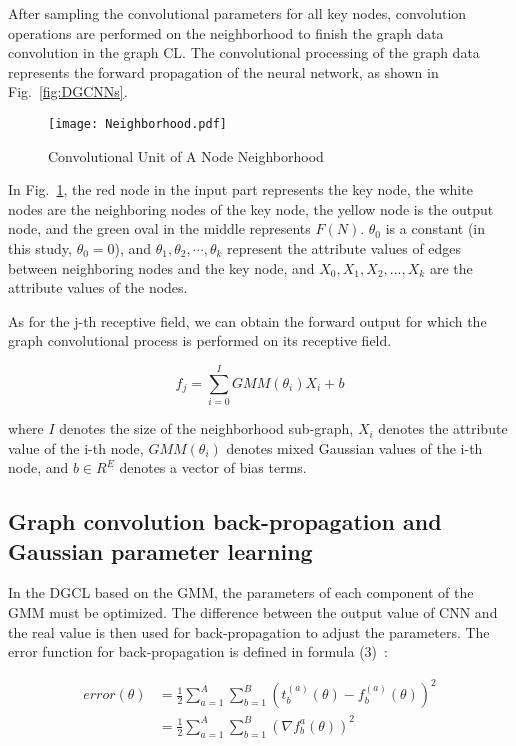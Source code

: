 \documentclass[11pt]{article}
\begin{document}
After sampling the convolutional parameters for all key nodes, convolution operations are performed on the neighborhood to finish the graph data convolution in the graph CL. The convolutional processing of the graph data represents the forward propagation of the neural network, as shown in Fig.~\ref{fig:DGCNNs}.



\begin{figure}
\vspace{-0.1in}
\centering
\texttt{[image: Neighborhood.pdf]}
\vspace{-0.1in}
\caption{Convolutional Unit of A Node Neighborhood}\label{fig:CUAN}
\vspace{-0.2in}
\end{figure}


In Fig.~\ref{fig:CUAN}, the red node in the input part represents the key node, the white nodes are the neighboring nodes of the key node, the yellow node is the output node, and the green oval in the middle represents $F(N)$. $\theta_0$ is a constant (in this study, $\theta_0=0$), and $\theta_1, \theta_2, \cdots, \theta_k$ represent the attribute values of edges between neighboring nodes and the key node, and $X_0, X_1, X_2,..., X_k$ are the attribute values of the nodes.


As for the j-th receptive field, we can obtain the forward output for which the graph convolutional process is performed on its receptive field.

\begin{equation}
f_j=\sum_{i=0}^I GMM(\theta_i)X_i+b
\end{equation}


where $I$ denotes the size of the neighborhood sub-graph, $X_i$ denotes the attribute value of the i-th node, $GMM (\theta_i)$ denotes mixed Gaussian values of the i-th node, and $b\in R^E$ denotes a vector of bias terms.


\subsection{Graph convolution back-propagation and Gaussian parameter learning}
In the DGCL based on the GMM, the parameters of each component of the GMM must be optimized. The difference between the output value of CNN and the real value is then used for back-propagation to adjust the parameters. The error function for back-propagation is defined in formula (3)~\cite{NIPS2012_4824}:

\begin{equation}
\begin{split}
error(\theta) &= \frac{1}{2} \sum_{a=1}^A \sum_{b=1}^B(t_b^{(a)}(\theta) - f_b^{(a)}(\theta))^2 \\
              &= \frac{1}{2} \sum_{a=1}^A \sum_{b=1}^B(\nabla f_b^{a}(\theta))^2
\end{split}
\end{equation}
\end{document}
